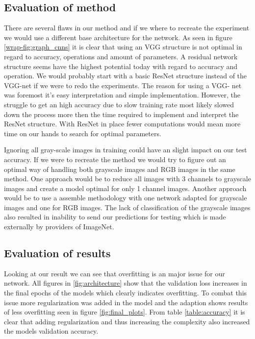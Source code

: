 \documentclass{kthreport}
\begin{document}
\subsection{Evaluation of method}

There are several flaws in our method and if we where to recreate the experiment we would use a different base architecture for the network.
As seen in figure \ref{wrap-fig:graph_cnns} it is clear that using an VGG structure is not optimal in regard to accuracy, operations and amount of parameters.
A residual network structure seems have the highest potential today with regard to accuracy and operation.
We would probably start with a basic ResNet structure instead of the VGG-net if we were to redo the experiments.
The reason for using a VGG- net was foremost it's easy interpretation and simple implementation. However, the struggle to get an high accuracy due to slow training rate most likely slowed down the process more then the time required to implement and interpret the ResNet structure.
With ResNet in place fewer computations would mean more time on our hands to search for optimal parameters.

Ignoring all gray-scale images in training could have an slight impact on our test accuracy. If we were to recreate the method we would try to figure out an optimal way of handling both grayscale images and RGB images in the same method. One approach would be to reduce all images with 3 channels to grayscale images and create a model optimal for only 1 channel images. Another approach would be to use a assemble methodology with one network adapted for grayscale images and one for RGB images. The lack of classification of the grayscale images also resulted in inability to send our predictions for testing which is made externally by providers of ImageNet.

\subsection{Evaluation of results}

Looking at our result we can see that overfitting is an major issue for our network.
All figures in \ref{fig:architecture} show that the validation loss increases in the final epochs of the models which clearly indicates overfitting.
To combat this issue more regularization was added in the model and the adaption shows results of less overfitting seen in figure \ref{fig:final_plots}.
From table \ref{table:accuracy} it is clear that adding regularization and thus increasing the complexity also increased the models validation accuracy.
\end{document}
